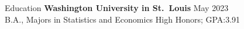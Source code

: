 \documentclass{resume}
\begin{document}
  

  \begin{rSection}{Education}
    {\bf Washington University in St.\ Louis} \hfill {May 2023 } \\
    { B.A., Majors in Statistics and Economics } \hfill { High Honors; GPA:\@ 3.91} \smallskip \\

    
  \end{rSection}

  

  
\end{document}
